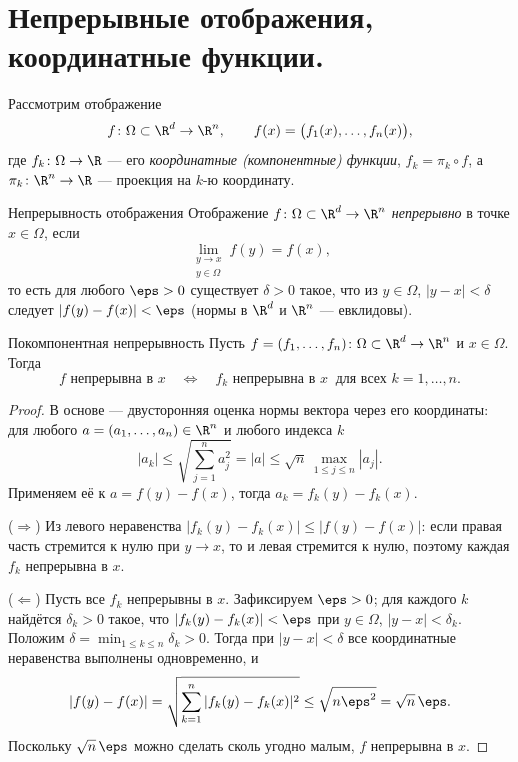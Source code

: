 
\section{Непрерывные отображения, координатные функции.}

Рассмотрим отображение
\[
f\colon\Omega\subset\R^d\to\R^n,\qquad
f(x)=\bigl(f_1(x),\dots,f_n(x)\bigr),
\]
где $f_k\colon\Omega\to\R$ --- его \emph{координатные (компонентные) функции}, $f_k=\pi_k\circ f$, а $\pi_k\colon\R^n\to\R$ --- проекция на $k$-ю координату.

\begin{Definition}{Непрерывность отображения}{}
	Отображение $f\colon\Omega\subset\R^d\to\R^n$ \emph{непрерывно} в точке $x\in\Omega$, если
	\[
	\lim_{\substack{y\to x\\ y\in\Omega}}f(y)=f(x),
	\]
	то есть для любого $\eps>0$ существует $\delta>0$ такое, что из $y\in\Omega$, $|y-x|<\delta$ следует $|f(y)-f(x)|<\eps$ (нормы в $\R^d$ и $\R^n$ --- евклидовы).
\end{Definition}

\begin{Statement}{Покомпонентная непрерывность}{}
	Пусть $f=(f_1,\dots,f_n)\colon\Omega\subset\R^d\to\R^n$ и $x\in\Omega$. Тогда
	\[
	f\text{ непрерывна в }x
	\quad\Longleftrightarrow\quad
	f_k\text{ непрерывна в }x\ \text{ для всех }k=1,\dots,n.
	\]
\end{Statement}

\begin{proof}
	В основе --- двусторонняя оценка нормы вектора через его координаты: для любого $a=(a_1,\dots,a_n)\in\R^n$ и любого индекса $k$
	\[
	|a_k|\le\sqrt{\sum_{j=1}^{n}a_j^2}=|a|\le\sqrt{n}\,\max_{1\le j\le n}|a_j|.
	\]
	Применяем её к $a=f(y)-f(x)$, тогда $a_k=f_k(y)-f_k(x)$.

	($\Rightarrow$) Из левого неравенства $|f_k(y)-f_k(x)|\le|f(y)-f(x)|$: если правая часть стремится к нулю при $y\to x$, то и левая стремится к нулю, поэтому каждая $f_k$ непрерывна в $x$.

	($\Leftarrow$) Пусть все $f_k$ непрерывны в $x$. Зафиксируем $\eps>0$; для каждого $k$ найдётся $\delta_k>0$ такое, что $|f_k(y)-f_k(x)|<\eps$ при $y\in\Omega$, $|y-x|<\delta_k$. Положим $\delta=\min_{1\le k\le n}\delta_k>0$. Тогда при $|y-x|<\delta$ все координатные неравенства выполнены одновременно, и
	\[
	|f(y)-f(x)|=\sqrt{\sum_{k=1}^{n}|f_k(y)-f_k(x)|^2}\le\sqrt{n\eps^2}=\sqrt{n}\,\eps.
	\]
	Поскольку $\sqrt{n}\,\eps$ можно сделать сколь угодно малым, $f$ непрерывна в $x$.
\end{proof}

